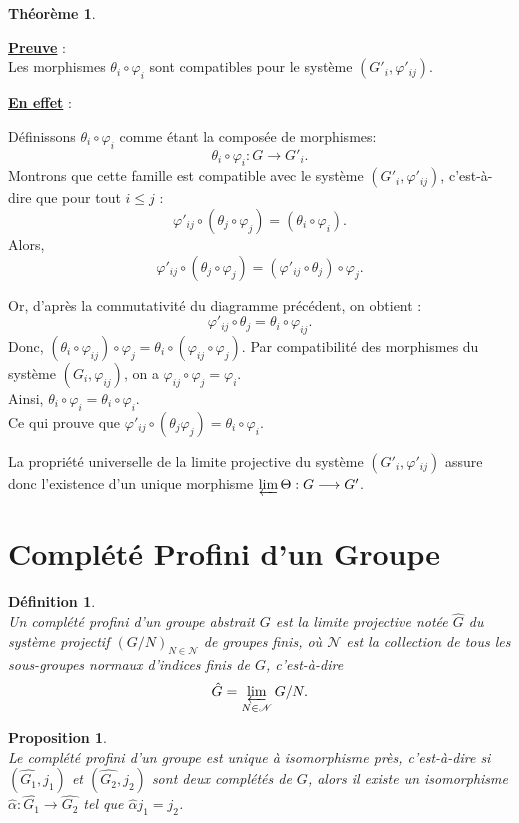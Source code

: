 \documentclass[a4paper, 14pt]{report}
\newtheorem{definition}{Définition}[section]
\newtheorem{proposition}{Proposition}[section]
\newtheorem{theorem}{Théorème}[section]
\begin{document}
\begin{onehalfspace}
{\begin{theorem}
	
\end{theorem}


\textbf{\underline{Preuve}} : \\
Les morphismes $\theta_i \circ \varphi_i$ sont compatibles pour le système $(G'_i, \varphi'_{ij})$.

\textbf{\underline{En effet}} :

Définissons $\theta_i \circ \varphi_i$ comme étant la composée de morphismes:
\[
\theta_i \circ \varphi_i : G \to G'_i.
\]
Montrons que cette famille est compatible avec le système $(G'_i, \varphi'_{ij})$, c'est-à-dire que pour tout $i \leq j$ :
\[
\varphi'_{ij} \circ (\theta_j \circ \varphi_j) = (\theta_i \circ \varphi_i).
\]	
Alors, 
\[
\varphi'_{ij} \circ (\theta_j \circ \varphi_j) = (\varphi'_{ij} \circ \theta_j) \circ \varphi_j.
\]

Or, d’après la commutativité du diagramme précédent, on obtient :
\[
\varphi'_{ij} \circ \theta_j = \theta_i \circ \varphi_{ij}.
\]
Donc, \((\theta_i \circ \varphi_{ij}) \circ \varphi_j = \theta_i \circ (\varphi_{ij} \circ \varphi_j).\)
Par compatibilité des morphismes du système $(G_i, \varphi_{ij})$, on a
\(\varphi_{ij} \circ \varphi_j = \varphi_i.\) \\
Ainsi,
\(
\theta_i \circ \varphi_i = \theta_i \circ \varphi_i.
\) \\
Ce qui prouve que 
\(
\varphi'_{ij} \circ (\theta_j \varphi_j) = \theta_i \circ \varphi_i.
\)

La propriété universelle de la limite projective du système $(G'_i, \varphi'_{ij})$ assure donc l'existence d'un unique morphisme $\varprojlim \Theta : G \longrightarrow G'$.


\section{Complété Profini d'un Groupe }

\begin{definition} \cite{herfort2012profinite}\\
Un complété profini d’un groupe abstrait \( G \) est la limite projective notée $\widehat{G}$ du système projectif \( (G/N)_{N \in \mathscr{N}} \) de groupes finis, où \( \mathscr{N} \) est la collection de tous les sous-groupes normaux d’indices finis de \( G \), c’est-à-dire
	\[
	\hat{G} = \varprojlim_{N \in \mathscr{N}} G/N.
	\]
\end{definition}

\begin{proposition} \cite{herfort2012profinite}\\
Le complété profini d’un groupe est unique à isomorphisme près, c’est-à-dire si $(\widehat{G_1}, j_1)$ et $(\widehat{G_2}, j_2)$ sont deux complétés de $G$, alors il existe un isomorphisme $\widehat{\alpha} : \widehat{G_1} \to \widehat{G_2}$ tel que $\widehat{\alpha} j_1 = j_2$.
\end{proposition}

}
\end{onehalfspace}
\end{document}
